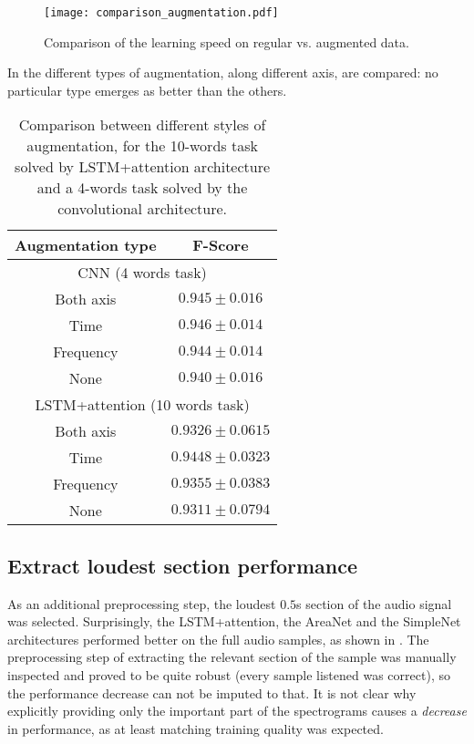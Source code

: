 \begin{figure}[t!]
    \centering
    \texttt{[image: comparison\_augmentation.pdf]}
    \caption{Comparison of the learning speed on regular vs. augmented data.}%
    \label{fig:augmentation_learning_speed}
\end{figure}

In  the different types of
augmentation, along different axis, are compared:
no particular type emerges as better than the others.

\begin{table}[t!]
    \centering
    \caption{Comparison between different styles of augmentation,
    for the 10-words task solved by LSTM+attention architecture and a
    4-words task solved by the convolutional architecture.}
    \label{tab:att_augmentation_comparison}
    \begin{tabular}{|c|c|}
        \hline
        Augmentation type & F-Score \\
        \hline
        \hline
        \multicolumn{2}{|c|}{CNN (4 words task)} \\
        \hline
        Both axis & $0.945 \pm 0.016$ \\
        Time      & $0.946 \pm 0.014$ \\
        Frequency & $0.944 \pm 0.014$ \\
        None      & $0.940 \pm 0.016$ \\
        \hline
        \hline
        \multicolumn{2}{|c|}{LSTM+attention (10 words task)} \\
        \hline
        Both axis & $0.9326 \pm 0.0615$ \\
        Time      & $0.9448 \pm 0.0323$ \\
        Frequency & $0.9355 \pm 0.0383$ \\
        None      & $0.9311 \pm 0.0794$ \\
        \hline
    \end{tabular}
\end{table}


\subsection{Extract loudest section performance}

As an additional preprocessing step, the loudest $0.5$s section of the audio
signal was selected.
%
Surprisingly, the LSTM+attention, the AreaNet and the SimpleNet architectures
performed better on the full audio samples, as shown in
.
%
The preprocessing step of extracting the relevant section of the sample was
manually inspected and proved to be quite robust (every sample listened was
correct), so the performance decrease can not be imputed to that.
%
It is not clear why explicitly providing only the important part of the
spectrograms causes a \textit{decrease} in performance, as at least matching
training quality was expected.

